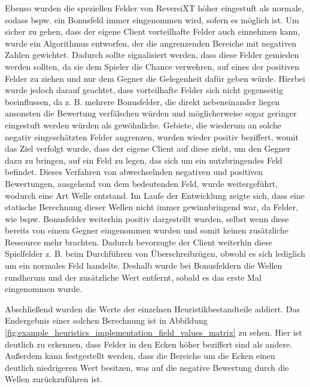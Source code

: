 \documentclass[12pt,a4paper,bibliography=totocnumbered,listof=totocnumbered]{article}
\begin{document}
Ebenso wurden die speziellen Felder von ReversiXT höher eingestuft als normale, sodass bspw. ein Bonusfeld immer eingenommen wird, sofern es möglich ist. Um sicher zu gehen, dass der eigene Client vorteilhafte Felder auch einnehmen kann, wurde ein Algorithmus entworfen, der die angrenzenden Bereiche mit negativen Zahlen gewichtet. Dadurch sollte signalisiert werden, dass diese Felder gemieden werden sollten, da sie dem Spieler die Chance verwehren, auf eines der positiven Felder zu ziehen und nur dem Gegner die Gelegenheit dafür geben würde. Hierbei wurde jedoch darauf geachtet, dass vorteilhafte Felder sich nicht gegenseitig beeinflussen, da z. B. mehrere Bonusfelder, die direkt nebeneinander liegen ansonsten die Bewertung verfälschen würden und möglicherweise sogar geringer eingestuft werden würden als gewöhnliche. Gebiete, die wiederum an solche negativ eingeschätzten Felder angrenzen, wurden wieder positiv beziffert, womit das Ziel verfolgt wurde, dass der eigene Client auf diese zieht, um den Gegner dazu zu bringen, auf ein Feld zu legen, das sich um ein nutzbringendes Feld befindet. Dieses Verfahren von abwechselnden negativen und positiven Bewertungen, ausgehend von dem bedeutenden Feld, wurde weitergeführt, wodurch eine Art Welle entstand.
Im Laufe der Entwicklung zeigte sich, dass eine statische Berechnung dieser Wellen nicht immer gewinnbringend war, da Felder, wie bspw. Bonusfelder weiterhin positiv dargestellt wurden, selbst wenn diese bereits von einem Gegner eingenommen wurden und somit keinen zusätzliche Ressource mehr brachten. Dadurch bevorzugte der Client weiterhin diese Spielfelder z. B. beim Durchführen von Überschreibzügen, obwohl es sich lediglich um ein normales Feld handelte. Deshalb wurde bei Bonusfeldern die Wellen rundherum und der zusätzliche Wert entfernt, sobald es das erste Mal eingenommen wurde.

Abschließend wurden die Werte der einzelnen Heuristikbestandteile addiert. Das Endergebnis einer solchen Berechnung ist in Abbildung \ref{fig:example_heuristics_implementation_field_values_matrix} zu sehen. Hier ist deutlich zu erkennen, dass Felder in den Ecken höher beziffert sind als andere. Außerdem kann festgestellt werden, dass die Bereiche um die Ecken einen deutlich niedrigeren Wert besitzen, was auf die negative Bewertung durch die Wellen zurückzuführen ist.
\end{document}
